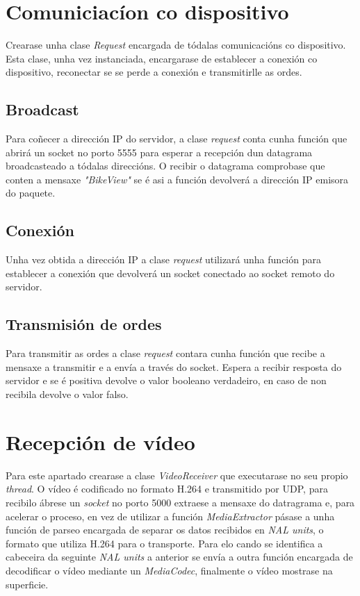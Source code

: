 \section{Comuniciacíon co dispositivo}
Crearase unha clase \emph{Request} encargada de tódalas comunicacións co dispositivo.  Esta clase, unha vez instanciada, encargarase de establecer a conexión co dispositivo, reconectar se se perde a conexión e transmitirlle as ordes.

\subsection{Broadcast}
Para coñecer a dirección IP do servidor, a clase \emph{request} conta cunha función que abrirá un socket no porto 5555 para esperar a recepción dun datagrama broadcasteado a tódalas direccións. O recibir o datagrama comprobase que conten a mensaxe \emph{"BikeView"} se é asi a función devolverá a dirección IP emisora do paquete.

\subsection{Conexión}
Unha vez obtida a dirección IP a clase \emph{request} utilizará unha función para establecer a conexión que devolverá un socket conectado ao socket remoto do servidor.

\subsection{Transmisión de ordes}
Para transmitir as ordes a clase \emph{request} contara cunha función que recibe a mensaxe a transmitir e a envía a través do socket. Espera a recibir resposta do servidor e se é positiva devolve o valor booleano verdadeiro, en caso de non recibila devolve o valor falso.

\section{Recepción de vídeo}
Para este apartado crearase a clase \emph{VideoReceiver} que executarase no seu propio \emph{thread}. O vídeo é codificado no formato H.264 e transmitido por UDP, para recibilo ábrese un \emph{socket} no porto 5000 extraese a mensaxe do datragrama e, para acelerar o proceso, en vez de utilizar a función \emph{MediaExtractor} pásase a unha función de parseo encargada de separar os datos recibidos en \emph{NAL units}, o formato que utiliza H.264 para o transporte. Para elo cando se identifica a cabeceira da seguinte \emph{NAL units} a anterior se envía a outra función encargada de decodificar o vídeo mediante un \emph{MediaCodec}, finalmente o vídeo mostrase na superficie.

